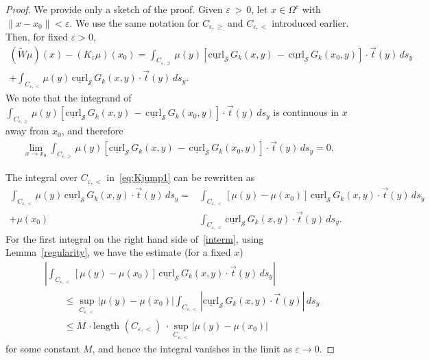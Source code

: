 \documentclass[final]{siamltex}
\renewcommand{\S} {\mathcal{S}}
\newcommand{\e}{\varepsilon}
\begin{document}
\begin{proof}
We provide only a sketch of the proof.  Given $\varepsilon \, > \,0$,
let $x\in \Omega^{c}$ with $ \| x-x_0\|<\varepsilon$.   We use the same
notation for $C_{\epsilon,\geq}$ and $C_{\epsilon,<}$ introduced
earlier.  Then, for fixed $\e>0$, 
\begin{align}
  (\widetilde{W}\mu)(x)-(K_{\varepsilon} \mu)(x_0) = 
  \int_{C_{\e,\geq}}\mu(y)\left[\underline{\mbox{curl}}_{\S}\, 
  G_{k}(x,y)\,-\,\underline{\mbox{curl}}_{\S}\,G_k(x_{0},y)
  \right]\cdot\vec{t}(y)\, ds_{y} \nonumber\\
  +\int_{C_{\e,<}} \mu(y)\,\underline{\mbox{curl}}_{\S}\,
  G_k(x,y)\cdot\vec{t}(y)\,ds_{y}.
  \label{eq:Kjump1}
\end{align}
We note that the integrand of $\int_{C_{\e,\geq}} \mu(y)
\left[\underline{\mbox{curl}}_{\S}\,
G_k(x,y)\,-\,\underline{\mbox{curl}}_{\S}\,G_k(x_0,y)\right]\cdot\vec{t}(y)\,
ds_{y}$ is continuous in $x$ away from  $x_0$, and therefore 
\begin{align*}
  \lim_{x\rightarrow x_0}  \int_{C_{\e,\geq}}
  \mu(y)\left[\underline{\mbox{curl}}_{\S}\,
  G_{k}(x,y)\,-\,\underline{\mbox{curl}}_{\S}\,
  G_{k}(x_{0},y)\right]\cdot\vec{t}(y)\,ds_{y} = 0.
\end{align*}

The integral over $C_{\e,<}$ in~\eqref{eq:Kjump1} can be rewritten as
\begin{align}
  \int_{C_{\e,<}} \mu(y)\,\underline{\mbox{curl}}_{\S}\,
    G_k(x,y)\cdot\vec{t}(y)\,ds_{y} 
  = &\int_{C_{\e,<}} \left[\mu(y)-\mu(x_0)\right]\,
    \underline{\mbox{curl}}_{\S}\,G_k(x,y)\cdot\vec{t}(y)\,ds_{y}
    \nonumber \\
  + \mu(x_0)&\int_{C_{\e,<}} \underline{\mbox{curl}}_{\S}\,
    G_k(x,y)\cdot\vec{t}(y)\,ds_{y}.
  \label{interm}
\end{align}
For the first integral on the right hand side of~\eqref{interm}, using
Lemma~\ref{regularity}, we have the estimate (for a fixed $x$)
\begin{align*}
  &\left|\int_{C_{\e,<}} \left[\mu(y)-\mu(x_0)\right]\,
    \underline{\mbox{curl}}_{\S}\,G_k(x,y)\cdot\vec{t}(y)\,ds_{y}\right| \\
  &\qquad \leq \sup_{C_{\e,<}} |\mu(y)-\mu(x_0)|
    \int_{C_{\e,<}} \left|\underline{\mbox{curl}}_{\S}\,
    G_k(x,y)\cdot\vec{t}(y)\right|\,ds_{y}\\
  &\qquad \leq M\,\cdot \mbox{length $(C_{\e,<})$}\;
    \cdot \sup_{C_{\e,<}} |\mu(y)-\mu(x_0)|
\end{align*}
for some constant $M$, and hence the integral vanishes in the limit as
$\varepsilon\longrightarrow 0$.


\end{proof}
\end{document}
